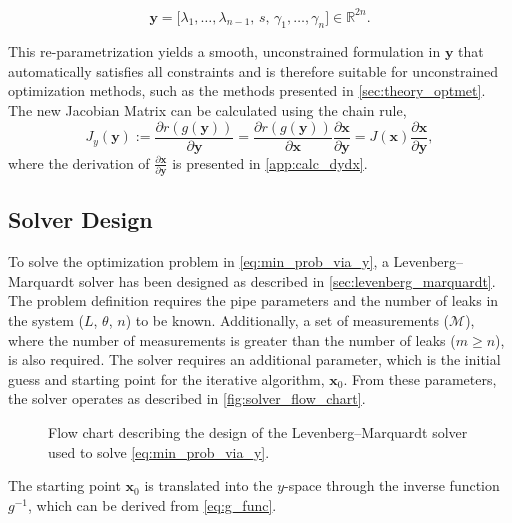 \begin{equation*}
\mathbf{y}
=
\bigl[
\lambda_1,\dots,\lambda_{n-1},\,
s,\,
\gamma_1,\dots,\gamma_n
\bigr]
\in \mathbb{R}^{2n}.
\end{equation*}

This re-parametrization yields a smooth, unconstrained formulation in $\mathbf{y}$ that automatically satisfies all constraints and is therefore suitable for unconstrained optimization methods, such as the methods presented in \autoref{sec:theory_optmet}.\\

The new Jacobian Matrix can be calculated using the chain rule,
\begin{equation}
\label{eq:Jy}
    J_y(\mathbf{y}):= \frac{\partial r(g(\mathbf{y}))}{\partial\mathbf{y}} 
    = \frac{\partial r(g(\mathbf{y}))}{\partial\mathbf{x}} \frac{\partial \mathbf{x}}{\partial\mathbf{y}}
    = J(\mathbf{x}) \frac{\partial \mathbf{x}}{\partial\mathbf{y}},
\end{equation}
where the derivation of $\frac{\partial \mathbf{x}}{\partial\mathbf{y}}$ is presented in \autoref{app:calc_dydx}. 

\newpage
\subsection{Solver Design}

To solve the optimization problem in \cref{eq:min_prob_via_y}, a Levenberg--Marquardt solver has been designed as described in \autoref{sec:levenberg_marquardt}. The problem definition requires the pipe parameters and the number of leaks in the system ($L$, $\theta$, $n$) to be known. Additionally, a set of measurements ($\mathcal{M}$), where the number of measurements is greater than the number of leaks ($m\geq n$), is also required. The solver requires an additional parameter, which is the initial guess and starting point for the iterative algorithm, $\mathbf{x}_0$. From these parameters, the solver operates as described in \autoref{fig:solver_flow_chart}.

\begin{figure}[ht]
    \centering
        
    \caption{Flow chart describing the design of the Levenberg--Marquardt solver used to solve \cref{eq:min_prob_via_y}.}
    \label{fig:solver_flow_chart}
\end{figure}

The starting point $\mathbf{x}_0$ is translated into the $y$-space through the inverse function $g^{-1}$, which can be derived from \cref{eq:g_func}.\\

